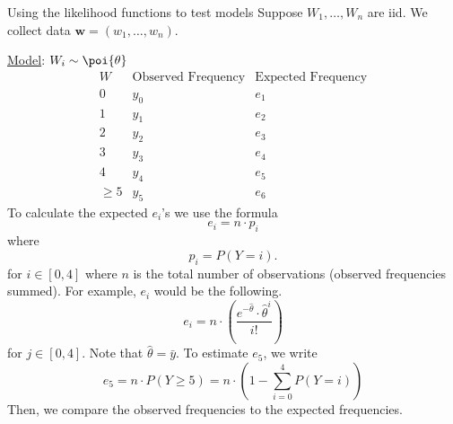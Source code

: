 \begin{Example}{Using the likelihood functions to test models}{}
    Suppose $ W_1,\ldots ,W_n $ are iid. We collect data $ \symbf{w}=(w_1,\ldots ,w_n) $.

    \underline{Model}: $ W_i \sim \poi{\theta} $
    \[
        \begin{array}{c|c|c|}
            W           & \text{Observed Frequency} & \text{Expected Frequency} \\
            \hline
            0           & y_0                       & e_1                       \\
            1           & y_1                       & e_2                       \\
            2           & y_2                       & e_3                       \\
            3           & y_3                       & e_4                       \\
            4           & y_4                       & e_5                       \\
            \geqslant 5 & y_5                       & e_6
        \end{array}
    \]
    To calculate the expected $ e_i $'s we use the formula
    \[ e_i=n\cdot p_i \]
    where
    \[ p_i=P(Y=i). \]
    for $ i\in[0,4] $ where $ n $ is the total number of observations (observed frequencies summed).
    For example, $ e_i $ would be the following.
    \[ e_i=n\cdot \left( \frac{e^{-\hat{\theta}}\cdot\hat{\theta}^{i}}{i!} \right) \]
    for $ j\in[0,4] $. Note that $ \hat{\theta}=\bar{y} $.
    To estimate $ e_5 $, we write
    \[ e_5=n\cdot P(Y\geqslant 5)=n\cdot \left( 1-\sum\limits_{i=0}^{4}P(Y=i) \right) \]
    Then, we compare the observed frequencies to the expected frequencies.
\end{Example}

